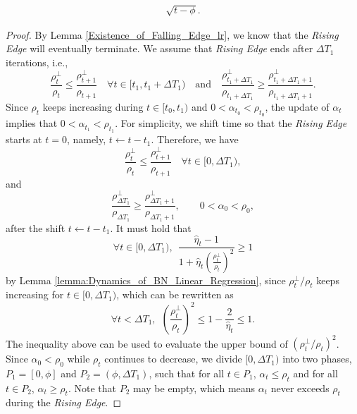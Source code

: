 \documentclass[pdflatex,sn-basic]{sn-jnl}%
\theoremstyle{thmstyleone}%
\begin{document}
\begin{appendices}
\begin{shaded}
\begin{restate_Divergence_lr}
\begin{equation*}
\begin{aligned}
    \sqrt{t - \phi}.
  \end{aligned}
  \end{equation*}
\end{restate_Divergence_lr}
\end{shaded}
\begin{proof}
  By Lemma \ref{Existence_of_Falling_Edge_lr}, we know that the \textit{Rising Edge} will eventually terminate. 
  We assume that \textit{Rising Edge} ends after \( \Delta T_1 \) iterations, i.e., 
  \[
    \frac{\rho_t^{\perp}}{\rho_t} \le \frac{\rho_{t+1}^{\perp}}{\rho_{t+1}} 
    \quad \forall t \in [t_1, t_1 + \Delta T_1)
    \quad \text{and} \quad 
    \frac{\rho_{t_1 + \Delta T_1}^{\perp}}{\rho_{t_1 + \Delta T_1}} \ge \frac{\rho_{t_1 + \Delta T_1+1}^{\perp}}{\rho_{t_1 + \Delta T_1+1}} .
  \]
  Since $\rho_t$ keeps increasing during $t \in [t_0, t_1)$ and $0 < \alpha_{t_0} < \rho_{t_0}$, 
  the update of $\alpha_t$ implies that $0 < \alpha_{t_1} < \rho_{t_1}$. 
  For simplicity, we shift time so that the \textit{Rising Edge} starts at $t=0$, namely,
  $t \leftarrow t - t_1$. 
  Therefore, we have 
  \[
    \frac{\rho_t^{\perp}}{\rho_t} \le \frac{\rho_{t+1}^{\perp}}{\rho_{t+1}} 
    \quad \forall t \in [0, \Delta T_1),
  \]
  and
  \[
    \frac{\rho_{\Delta T_1 }^{\perp}}{\rho_{\Delta T_1 }} \ge \frac{\rho_{\Delta T_1 +1}^{\perp}}{\rho_{\Delta T_1 +1}},
    \qquad
    0 < \alpha_0 < \rho_0,
  \]
  after the shift $t \leftarrow t - t_1$.
  It must hold that
  \[
  \forall t \in [0, \Delta T_1), \ \  \frac{\hat{\eta}_t - 1}{1 + \hat{\eta}_t \left( \frac{\rho_t^{\perp}}{\rho_t} \right)^2} \ge 1
  \]
  by Lemma \ref{lemma:Dynamics_of_BN_Linear_Regression}, 
  since \( {\rho_t^{\perp}}/{\rho_t} \) keeps increasing for \( t \in [0, \Delta T_1) \), 
  which can be rewritten as
  \begin{equation}
    \forall t < \Delta T_1, \ \  \left( \frac{\rho_t^{\perp}}{\rho_t} \right)^2 \le 1 - \frac{2}{\hat{\eta}_t} \le 1. 
    \label{eq:first}
  \end{equation}
  The inequality above can be used to evaluate the upper bound of \( \left( {\rho_t^{\perp}}/{\rho_t} \right)^2 \). 
  Since \( \alpha_0 < \rho_0 \) while \( \rho_t \) continues to decrease, we divide \( [0, \Delta T_1) \) 
  into two phases, \( P_1 = [0, \phi] \) and \( P_2 = (\phi, \Delta T_1) \), 
  such that for all \( t \in P_1 \), \( \alpha_t \le \rho_t \) and for all \( t \in P_2 \), \( \alpha_t \ge \rho_t \). 
  Note that \( P_2 \) may be empty, which means \( \alpha_t \) never exceeds \( \rho_t \) during the \textit{Rising Edge}.
  

\end{proof}
\end{appendices}
\end{document}
